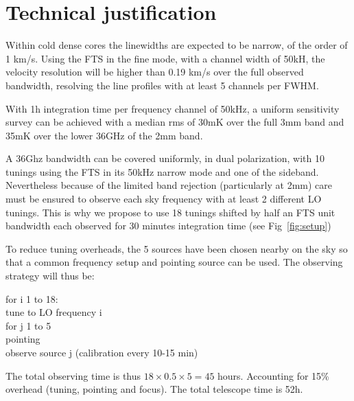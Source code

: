\section{Technical justification}
 Within cold dense cores the linewidths are expected to be narrow, of the order of 1 km/s. Using the FTS in the fine mode, with a channel width of 50kH, the velocity resolution will be higher than 0.19 km/s over the full observed bandwidth, resolving the line profiles with at least 5 channels per FWHM.

With 1h integration time per frequency channel of 50kHz, a uniform sensitivity survey can be achieved with a median rms of 30mK over the full 3mm band and 35mK over the lower 36GHz of the 2mm band. 

A 36Ghz bandwidth can be covered uniformly, in dual polarization, with 10 tunings using the FTS in its 50kHz narrow mode and one of the sideband. Nevertheless because of the limited band rejection (particularly at 2mm) care must be ensured to observe each sky frequency with at least 2 different LO tunings. This is why we propose to use 18 tunings shifted by half an FTS unit bandwidth each observed for 30 minutes integration time (see Fig~\ref{fig:setup})

To reduce tuning overheads, the 5 sources have been chosen nearby on the sky so that a common frequency setup and pointing source can be used. The observing strategy will thus be: 

\noindent for i 1 to 18:\\
\indent  tune to LO frequency i\\
\indent  for j 1 to 5\\
\indent pointing\\
\indent observe source j (calibration every 10-15 min)

The total observing time is thus $18\times0.5\times5=45$ hours. Accounting for 15\% overhead (tuning, pointing and focus). The total telescope time is 52h.
   
  
  
  
  
  
  
  
  